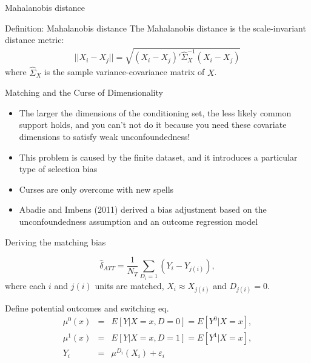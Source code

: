 \documentclass{beamer}
\begin{document}
\begin{frame}{Mahalanobis distance}
	
	\begin{block}{Definition: Mahalanobis distance}
	The Mahalanobis distance is the scale-invariant distance metric:
		\begin{eqnarray*}
		||X_i-X_j|| = \sqrt{ (X_i-X_j)'\widehat{\Sigma}_X^{-1}(X_i - X_j) }
		\end{eqnarray*}
	where $\widehat{\Sigma}_X$ is the sample variance-covariance matrix of $X$.
	\end{block}


\end{frame}



\begin{frame}{Matching and the Curse of Dimensionality}
	
\begin{itemize}
\item The larger the dimensions of the conditioning set, the less likely common support holds, and you can't not do it because you need these covariate dimensions to satisfy weak unconfoundedness!
\item This problem is caused by the finite dataset, and it introduces a particular type of selection bias
\item Curses are only overcome with new spells  
\item Abadie and Imbens (2011) derived a bias adjustment based on the unconfoundedness assumption and an outcome regression model
\end{itemize}

\end{frame}


\begin{frame}{Deriving the matching bias}
	
  \vspace{-5mm}
  $$
		\widehat{\delta}_{ATT} = \frac{1}{N_T} \sum_{D_i=1} (Y_i - Y_{j(i)}),
  $$
  where each $i$ and $j(i)$ units are matched, $X_i \approx X_{j(i)}$ and $D_{j(i)}=0$. 
	 
  \bigskip
  Define potential outcomes and switching eq.
		\begin{eqnarray*}
      \mu^0(x) &=& E[Y | X=x,D=0] = E[Y^0 | X=x],\\
      \mu^1(x) &=& E[Y | X=x,D=1] = E[Y^1 | X=x],\\
      Y_i &=& \mu^{D_i}(X_i) + \varepsilon_i
		\end{eqnarray*}
\end{frame}
\end{document}
